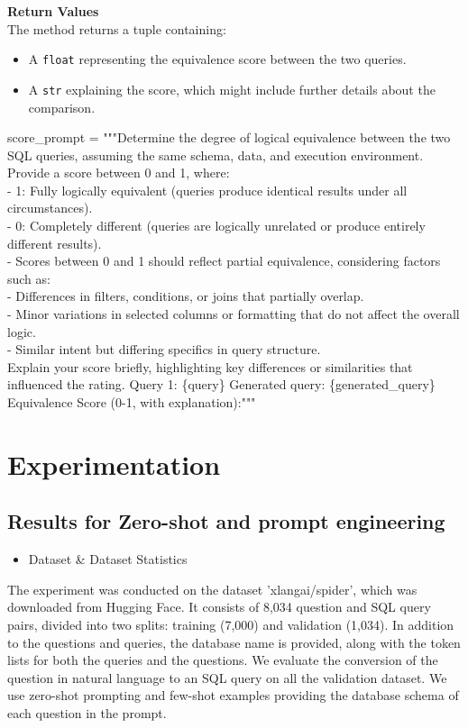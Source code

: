 \documentclass[12pt,a4paper]{article}
\begin{document}
\textbf{Return Values}
\\
The method returns a tuple containing:
\begin{itemize}
    \item A \texttt{float} representing the equivalence score between the two queries.
    \item A \texttt{str} explaining the score, which might include further details about the comparison.
\end{itemize}


score\_prompt = """Determine the degree of logical equivalence between the two SQL queries, assuming the same schema, data, and execution environment. Provide a score between 0 and 1, where:
\\
- 1: Fully logically equivalent (queries produce identical results under all circumstances).
\\
- 0: Completely different (queries are logically unrelated or produce entirely different results).
\\
- Scores between 0 and 1 should reflect partial equivalence, considering factors such as:
\\
- Differences in filters, conditions, or joins that partially overlap.
\\
- Minor variations in selected columns or formatting that do not affect the overall logic.
\\
- Similar intent but differing specifics in query structure.
\\
Explain your score briefly, highlighting key differences or similarities that influenced the rating.
Query 1:
\{query\}
Generated query:
\{generated\_query\}
Equivalence Score (0-1, with explanation):"""






\section*{Experimentation}
\subsection*{Results for Zero-shot and prompt engineering}

\begin{itemize}
  \item Dataset \& Dataset Statistics
  \end{itemize}
  The experiment was conducted on the dataset 'xlangai/spider', which was downloaded from Hugging Face. It consists of 8,034 question and SQL query pairs, divided into two splits: training (7,000) and validation (1,034). In addition to the questions and queries, the database name is provided, along with the token lists for both the queries and the questions. We evaluate the conversion of the question in natural language to an SQL query on all the validation dataset. We use zero-shot prompting and few-shot examples providing the database schema of each question in the prompt.
  
\end{document}
